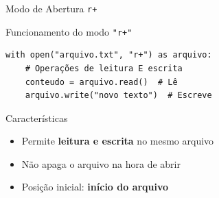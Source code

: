 \begin{frame}[fragile]{Modo de Abertura \texttt{r+}}

    \begin{block}{Funcionamento do modo \texttt{"r+"}}
        \begin{verbatim}
with open("arquivo.txt", "r+") as arquivo:
    # Operações de leitura E escrita
    conteudo = arquivo.read()  # Lê
    arquivo.write("novo texto")  # Escreve
\end{verbatim}
    \end{block}

    \begin{alertblock}{Características}
        \begin{itemize}
            \item Permite \textbf{leitura e escrita} no mesmo arquivo
            \item Não apaga o arquivo na hora de abrir
            \item Posição inicial: \textbf{início do arquivo}
        \end{itemize}
    \end{alertblock}

\end{frame}

